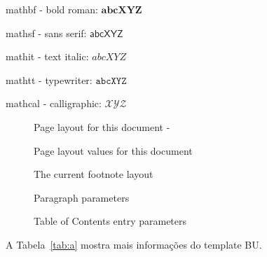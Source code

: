 mathbf - bold roman: $\mathbf{abcXYZ}$

mathsf - sans serif: $\mathsf{abcXYZ}$

mathit - text italic: $\mathit{abcXYZ}$

mathtt -  typewriter: $\mathtt{abcXYZ}$

mathcal - calligraphic: $\mathcal{XYZ}$



\begin{figure}
	\caption{Page layout for this document -  \showfont} \label{fig:ptrs}
	\drawparameterstrue
	\drawpage
\end{figure}


\begin{figure}
	\caption{Page layout values for this document} \label{fig:ptrsval}

	\pagevalues
\end{figure}



\begin{figure}
	\currentfootnote
	\drawparameterstrue
	\drawfootnote
	\footnotevalues
	\caption{The current footnote layout}\label{fig:ftry}
\end{figure}	
	

\begin{figure}
	\drawparagraph
	\paragraphvalues
	\caption{Paragraph parameters}\label{fig:fpara}
\end{figure}


\begin{figure}
    \drawparameterstrue
	\drawtoc
	\tocvalues
	\caption{Table of Contents entry parameters}\label{fig:tocp}
\end{figure}





A Tabela~\ref{tab:a} mostra mais informações do template BU.

